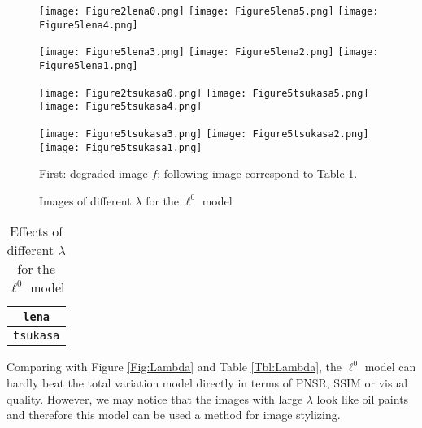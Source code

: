 \documentclass[english, nochinese]{pnote}
\begin{document}
\begin{figure}[htb]
{
\centering

\texttt{[image: Figure2lena0.png]}
\texttt{[image: Figure5lena5.png]}
\texttt{[image: Figure5lena4.png]}

\texttt{[image: Figure5lena3.png]}
\texttt{[image: Figure5lena2.png]}
\texttt{[image: Figure5lena1.png]}

\texttt{[image: Figure2tsukasa0.png]}
\texttt{[image: Figure5tsukasa5.png]}
\texttt{[image: Figure5tsukasa4.png]}

\texttt{[image: Figure5tsukasa3.png]}
\texttt{[image: Figure5tsukasa2.png]}
\texttt{[image: Figure5tsukasa1.png]}

\caption{Images of different $\lambda$ for the $\ell^0$ model}
\label{Fig:L0}
}
{
\footnotesize First: degraded image $f$; following image correspond to Table \ref{Tbl:L0}.
}
\end{figure}

\begin{table}[htb]
\centering
\begin{tabular}{|c|c|c|c|c|c|c|}
\hline
\multicolumn{7}{|c|}{\texttt{lena}} \\
\hline

\multicolumn{7}{|c|}{\texttt{tsukasa}} \\
\hline

\end{tabular}
\caption{Effects of different $\lambda$ for the $\ell^0$ model}
\label{Tbl:L0}
\end{table}

Comparing with Figure \ref{Fig:Lambda} and Table \ref{Tbl:Lambda}, the $\ell^0$ model can hardly beat the total variation model directly in terms of PNSR, SSIM or visual quality. However, we may notice that the images with large $\lambda$ look like oil paints and therefore this model can be used a method for image stylizing.

\printbibliography
\end{document}
